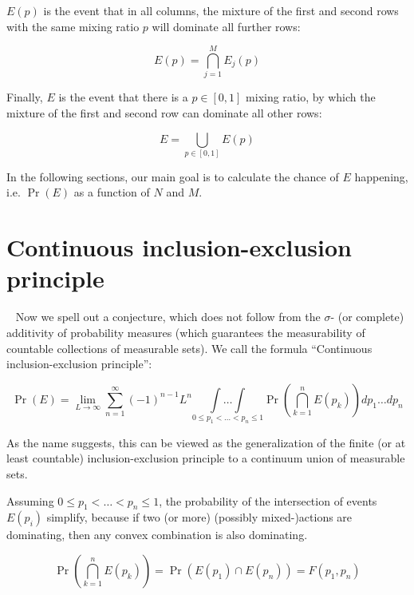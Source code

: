 \documentclass{article}
\newcommand{\warning}{{\fontencoding{U}\fontfamily{futs}\selectfont\char 49\relax} \ }
\theoremstyle{definition}
\begin{document}
$E(p)$ is the event that in all columns, the mixture of the first and second rows with the same mixing ratio $p$ will dominate all further rows:

\begin{equation}
    E(p) = \bigcap_{j=1}^M E_j(p)
\end{equation}

Finally, $E$ is the event that there is a $p\in[0,1]$ mixing ratio, by which the mixture of the first and second row can dominate all other rows:

\begin{equation}
    E = \bigcup_{p \in [0,1]} E(p)
\end{equation}

In the following sections, our main goal is to calculate the chance of $E$ happening, i.e. $\Pr(E)$ as a function of $N$ and $M$.

\section{Continuous inclusion-exclusion principle}


\warning
Now we spell out a conjecture, which does not follow from the $\sigma$- (or complete) additivity of probability measures \cite{book:Kolmogorov,book:Renyi1970} (which guarantees the measurability of countable collections of measurable sets). We call the formula
``Continuous inclusion-exclusion principle'':

\begin{equation}
\label{eq:CIEP}
    \Pr(E) = \lim_{L \to \infty} \sum_{n=1}^\infty (-1)^{n-1} L^n
    \underset{0 \le p_1 < \dots < p_n \le 1}{\int\dots\int}
    \Pr \left ( 
    \bigcap_{k=1}^n E(p_k)
    \right ) 
    dp_1\dots dp_n
\end{equation}

As the name suggests, this can be viewed as the generalization of the finite (or at least countable) inclusion-exclusion principle to a continuum union of measurable sets.

Assuming $0\le p_1<\dots<p_n\le 1$, the probability of the intersection of events $E(p_i)$ simplify, because if two (or more) (possibly mixed-)actions are dominating, then any convex combination is also dominating. 

\begin{equation}
    \Pr \left ( 
    \bigcap_{k=1}^n E(p_k)
    \right ) 
    =
    \Pr \left (
    E(p_1) \cap E(p_n)
    \right )
    =
    F(p_1,p_n)
\end{equation}
\end{document}
